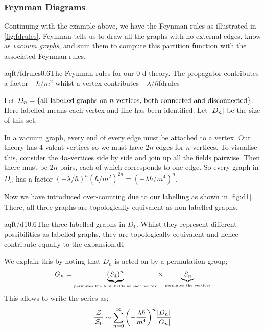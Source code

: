 \subsubsection{Feynman Diagrams}
Continuing with the example above, we have the Feynman rules as illustrated in \autoref{fig:fdrules}. Feynman tells us to draw all the graphs with no external edges, know as \emph{vacuum graphs}, and sum them to compute this partition function with the associated Feynman rules. 
\begin{mygraphic}{aqft/fdrules}{0.6}{The Feynman rules for our 0-d theory. The propagator contributes a factor $-\hbar/m^2$ whilst a vertex contributes $-\lambda/\hbar$}{fdrules}\end{mygraphic}
Let $D_n = \set{\text{all labelled graphs on }n\text{ vertices, both connected and disconnected}}$. Here labelled means each vertex and line has been identified. Let $\abs{D_n}$ be the size of this set.
\begin{definitionbox}
In a vacuum graph, every end of every edge must be attached to a vertex. Our theory has $4$-valent vertices so we must have $2n$ edges for $n$ vertices. To visualise this, consider the $4n$-vertices side by side and join up all the fields pairwise. Then there must be $2n$ pairs, each of which corresponds to one edge. So every graph in $D_n$ has a factor $(-\lambda/\hbar)^n (\hbar/m^2)^{2n} = (-\lambda\hbar/m^4)^n$.
\end{definitionbox}
Now we have introduced over-counting due to our labelling as shown in \autoref{fig:d1}. There, all three graphs are topologically equivalent as non-labelled graphs.
\begin{mygraphic}{aqft/d1}{0.6}{The three labelled graphs in $D_1$. Whilst they represent different possibilities as labelled graphs, they are topologically equivalent and hence contribute equally to the expansion.}{d1}\end{mygraphic}
We explain this by noting that $D_n$ is acted on by a permutation group;
\begin{equation*}
G_n = \underbrace{\left(S_4\right)^n}_{\text{\tiny{permutes the four fields at each vertex}}} \times \underbrace{S_n}_{\text{\tiny{permutes the vertices}}}
\end{equation*}
This allows to write the series as;
\begin{equation}
\frac{\mZ}{\mZ_0} \sim \sum_{n = 0}^{\infty}{\left(-\frac{\lambda \hbar}{m^4}\right)^n \frac{\abs{D_n}}{\abs{G_n}}}
\end{equation}
